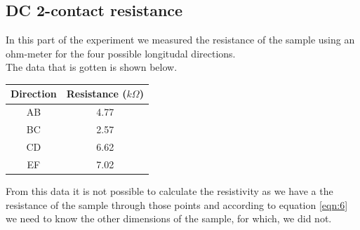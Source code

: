 \documentclass[twocolumn]{article}
\begin{document}
\subsection{DC 2-contact resistance}
In this part of the experiment we measured the resistance of the sample using 
an ohm-meter for the four possible longitudal directions.
\\
The data that is gotten is shown below.
\begin{minipage}{\linewidth}
\Centering
\begin{tabular}{|c|c|}
\hline
Direction & Resistance ($k\Omega$) \\ \hline
AB & 4.77 \\ \hline
BC & 2.57 \\ \hline
CD & 6.62 \\ \hline
EF & 7.02 \\ \hline
\end{tabular}
\label{tbl:3}
\end{minipage}
From this data it is not possible to calculate the resistivity as we have a 
the resistance of the sample through those points and according to equation 
\ref{eqn:6} we need to know the other dimensions of the sample, for which, we 
did not.
\end{document}
